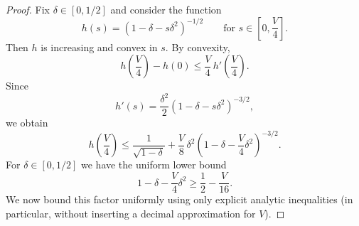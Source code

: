 \documentclass[11pt]{article}
\begin{document}
\begin{proof}
Fix $\delta\in[0,1/2]$ and consider the function
\begin{equation}
h(s)=(1-\delta-s\delta^2)^{-1/2}
\qquad\text{for } s\in\left[0,\frac{V}{4}\right].
\end{equation}
Then $h$ is increasing and convex in $s$.
By convexity,
\begin{equation}
h\left(\frac{V}{4}\right)-h(0)\le \frac{V}{4}\,h'\left(\frac{V}{4}\right).
\end{equation}
Since
\begin{equation}
h'(s)=\frac{\delta^2}{2}(1-\delta-s\delta^2)^{-3/2},
\end{equation}
we obtain
\begin{equation}
h\left(\frac{V}{4}\right)
\le
\frac{1}{\sqrt{1-\delta}}+\frac{V}{8}\,\delta^2\left(1-\delta-\frac{V}{4}\delta^2\right)^{-3/2}.
\end{equation}
For $\delta\in[0,1/2]$ we have the uniform lower bound
\begin{equation}
1-\delta-\frac{V}{4}\delta^2 \ge \frac{1}{2}-\frac{V}{16}.
\end{equation}
We now bound this factor uniformly using only explicit analytic inequalities (in particular, without inserting a decimal approximation for $V$). 


\end{proof}
\end{document}
